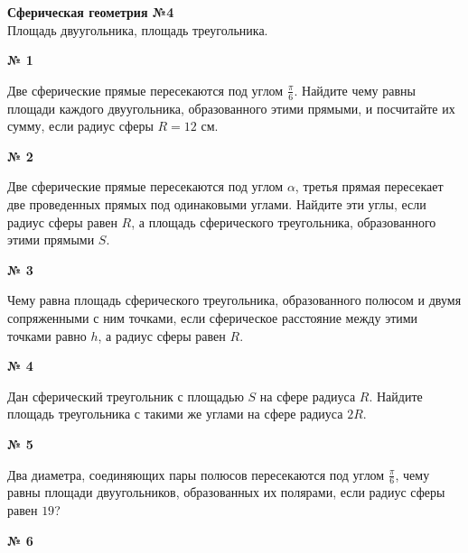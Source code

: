 


    \begin{center}
        \textbf{Сферическая геометрия №4}\\
        Площадь двуугольника, площадь треугольника.
    \end{center}

    \begin{center}
        \textbf{№ 1}
    \end{center}

    Две сферические прямые пересекаются под углом $\frac{\pi}{6}$.
    Найдите чему равны площади каждого двуугольника, образованного этими прямыми, и посчитайте их сумму,
    если радиус сферы $R=12$ см.

    \begin{center}
        \textbf{№ 2}
    \end{center}

    Две сферические прямые пересекаются под углом $\alpha$, третья прямая пересекает две проведенных прямых
    под одинаковыми углами.
    Найдите эти углы, если радиус сферы равен $R$, а площадь сферического треугольника, образованного этими прямыми $S$.

    \begin{center}
        \textbf{№ 3}
    \end{center}

    Чему равна площадь сферического треугольника, образованного полюсом и двумя сопряженными с ним точками,
    если сферическое расстояние между этими точками равно $h$, а радиус сферы равен $R$.

    \begin{center}
        \textbf{№ 4}
    \end{center}

    Дан сферический треугольник с площадью $S$ на сфере радиуса $R$.
    Найдите площадь треугольника с такими же углами на сфере радиуса $2R$.

    \begin{center}
        \textbf{№ 5}
    \end{center}

    Два диаметра, соединяющих пары полюсов пересекаются под углом $\frac{\pi}{6}$,
    чему равны площади двуугольников, образованных их полярами, если радиус сферы равен $19$?

    \begin{center}
        \textbf{№ 6}
    \end{center}

